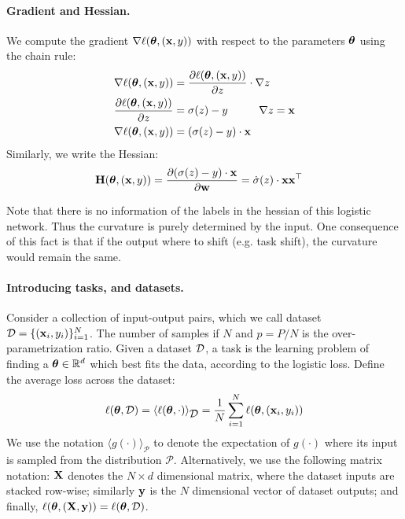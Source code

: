 \documentclass{article} %
\newcommand{\hessian}{\vH}
\begin{document}
\paragraph{Gradient and Hessian. }
We compute the gradient $\nabla{\ell(\mbox{$\mbox{$\boldsymbol{\theta}$}$}, (\mbox{$\mbox{$\mathbf{x}$}$},y))}$ with respect to the parameters $\mbox{$\mbox{$\boldsymbol{\theta}$}$}$ using the chain rule: 
\begin{align}
    &\nabla{\ell(\mbox{$\mbox{$\boldsymbol{\theta}$}$}, (\mbox{$\mbox{$\mathbf{x}$}$},y))} = \frac{\partial{\ell(\mbox{$\mbox{$\boldsymbol{\theta}$}$}, (\mbox{$\mbox{$\mathbf{x}$}$},y))}}{\partial{z}} \cdot \nabla{z}\\
    & \frac{\partial{\ell(\mbox{$\mbox{$\boldsymbol{\theta}$}$}, (\mbox{$\mbox{$\mathbf{x}$}$},y))}}{\partial{z}} = \sigma(z) - y 
    \hspace{1cm}  \nabla{z} = \mbox{$\mbox{$\mathbf{x}$}$}
        \\
    & \nabla{\ell(\mbox{$\mbox{$\boldsymbol{\theta}$}$}, (\mbox{$\mbox{$\mathbf{x}$}$},y))} =  (\sigma(z) - y)\cdot \mbox{$\mbox{$\mathbf{x}$}$}  
\end{align}
Similarly, we write the Hessian:
\begin{align}
\label{eq:hessian}
    \hessian(\vparam, (\vx, y)) = 
            \deriv{(\sigma(z) - y)\cdot \vx}{\vw}
    &= \dot\sigma(z)\cdot \vx\vx^\top
\end{align}

\begin{remark}
     Note that there is no information of the labels in the hessian of this logistic network. Thus the curvature is purely determined by the input. One consequence of this fact is that if the output where to shift (e.g. task shift), the curvature would remain the same. 
\end{remark}

\paragraph{Introducing tasks, and datasets.} Consider a collection of input-output pairs, which we call dataset $\mbox{${\cal D}$} = \{(\mbox{$\mbox{$\mathbf{x}$}$}_i, y_i)\}_{i=1}^N$. The number of samples if $N$ and $p = P/N$ is the over-parametrization ratio. Given a dataset $\mbox{${\cal D}$}$, a task is the learning problem of finding a $\mbox{$\mbox{$\boldsymbol{\theta}$}$} \in \mathbb{R}^d$ which best fits the data, according to the logistic loss. Define the average loss across the dataset: 
\begin{align}
    \ell(\mbox{$\mbox{$\boldsymbol{\theta}$}$}, \mbox{${\cal D}$}) = \langle \ell(\mbox{$\mbox{$\boldsymbol{\theta}$}$}, \cdot) \rangle_{\mbox{${\cal D}$}} = \frac{1}{N} \sum_{i=1}^N \ell(\mbox{$\mbox{$\boldsymbol{\theta}$}$}, (\mbox{$\mbox{$\mathbf{x}$}$}_i, y_i))
\end{align}
We use the notation $\langle g(\cdot) \rangle_\mathcal{P}$ to denote the expectation of $g(\cdot)$ where its input is sampled from the distribution $\mathcal{P}$. Alternatively, we use the following matrix notation: $\mbox{$\mbox{$\mathbf{X}$}$}$ denotes the $N\times d$ dimensional matrix, where the dataset inputs are stacked row-wise; similarly $\mbox{$\mbox{$\mathbf{y}$}$}$ is the $N$ dimensional vector of dataset outputs; and finally, $\ell(\mbox{$\mbox{$\boldsymbol{\theta}$}$}, (\mbox{$\mbox{$\mathbf{X}$}$}, \mbox{$\mbox{$\mathbf{y}$}$}))=\ell(\mbox{$\mbox{$\boldsymbol{\theta}$}$}, \mbox{${\cal D}$})$. 
\end{document}
